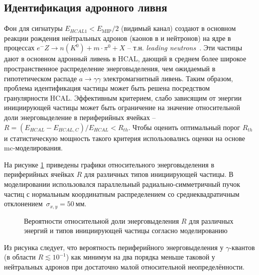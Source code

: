\subsection{Идентификация адронного ливня}

Фон для сигнатуры $E_{HCAL1} < E_{\text{MIP}}/2$ (видимый канал)
создают в основном реакции рождения нейтральных адронов (каонов в и нейтронов)
на ядре в процессах $e^{-}Z\rightarrow n(K^0) + m\cdot\pi^0 + X$ --
т.н. \emph{leading neutrons}~\cite{leading-neutron-hera}.
Эти частицы дают в основном адронный ливень в HCAL, дающий
в среднем более широкое пространственное распределение энерговыделения,
чем ожидаемый в гипотетическом
распаде $a\rightarrow\gamma\gamma$ электромагнитный ливень.
Таким образом, проблема идентификация частицы
может быть решена посредством гранулярности HCAL.
Эффективным критерием, слабо зависящим от энергии
инициирующей частицы может быть ограничение на
значение относительной доли энерговыделение в периферийных ячейках --
$R = (E_{HCAL} - E_{HCAL,C})/E_{HCAL} < R_{th}$.
Чтобы оценить оптимальный порог $R_{th}$
и статистическую мощность такого критерия использовались оценки
на основе \acrshort{mc}-моделирования.

На рисунке \ref{fig:var-ptype-ratios} приведены графики относительного
энерговыделения в периферийных ячейках $R$ для различных типов
инициирующей частицы. В моделировании использовался параллельный
радиально-симметричный пучок частиц с нормальным координатным
распределением со среднеквадратичным
отклонением~$\sigma_{x,y}=50~\text{мм}$.
\begin{figure}[ht]
    \centering
    \resizebox{!}{.35\textwidth}{}
    \resizebox{!}{.35\textwidth}{}
    \resizebox{!}{.35\textwidth}{}
    \resizebox{!}{.35\textwidth}{}
    \caption{Вероятности относительной доли энерговыделения $R$  %
    для различных энергий и типов инициирующей частицы согласно
    моделированию}
    \label{fig:var-ptype-ratios}
\end{figure}
Из рисунка следует, что вероятность периферийного энерговыделения
у $\gamma$-квантов (в области $R \lesssim 10^{-1}$) как
минимум на два порядка меньше таковой у нейтральных адронов при
достаточно малой относительной неопределённости.

